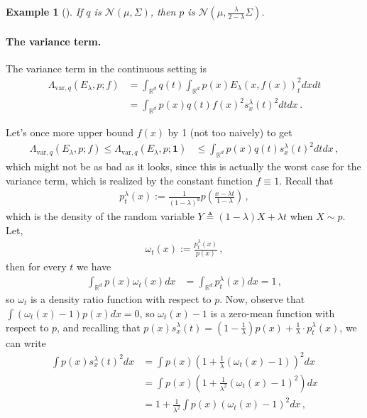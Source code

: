 \documentclass{article}
\theoremstyle{plain}
\theoremstyle{definition}
\theoremstyle{plain}
\newtheorem{exampleinner}[theorem]{Example}
\newenvironment{example}[1][]{%
    \begin{mdframed}[style=examplestyle]%
    \begin{exampleinner}[#1]%
}{%
    \end{exampleinner}%
    \end{mdframed}%
}
\newcommand{\Rd}{\mathbb{R}^d}
\newcommand{\cN}{\mathcal N}
\begin{document}
\begin{example}
    If $q$ is $\cN(\mu, \Sigma)$, then $p$ is $\cN(\mu, \frac{\lambda}{2-\lambda}\Sigma)$.
\end{example}

\paragraph{The variance term.}
The variance term  in the continuous setting is
\begin{align}
    \Lambda_{\text{var}, q}(E_\lambda, p; f)
     & =
    \int_{\Rd} q(t) \int_{\Rd} p(x) E_\lambda(x, f(x))_t^2 dx dt \\
     & = \int_{\Rd} p(x) q(t) f(x)^2 s^\lambda_x(t)^2 dt dx\,.
\end{align}

Let's once more upper bound $f(x)$ by 1 (not too naively) to get
\begin{align}
    \Lambda_{\text{var}, q}(E_\lambda, p; f)
    \leq
    \Lambda_{\text{var}, q}(E_\lambda, p; \mathbf{1})
     & \le \int_{\Rd} p(x) q(t) s^\lambda_x(t)^2 dt dx\,,
\end{align}
which might not be as bad as it looks, since this is actually the worst case for the variance
term, which is realized by the constant function $f\equiv 1$.
Recall that
\begin{align}
    p_t^\lambda(x) := \frac{1}{(1-\lambda)^{d}}p\left(
    \frac{
        x - \lambda t
    }{
        1 - \lambda
    }
    \right)\,,
\end{align}
which is the density of the random variable $Y\triangleq(1-\lambda)X + \lambda t$ when $X\sim p$.
Let,
\begin{align}
    \omega_t(x) := \frac{p_t^\lambda(x)}{p(x)}\,,
\end{align}
then for every $t$ we have
\begin{align}
    \int_{\Rd} p(x) \omega_t(x) dx
     & = \int_{\Rd} p_t^\lambda(x) dx
    = 1\,,
\end{align}
so $\omega_t$ is a density ratio function with respect to $p$.
Now, observe that $\int (\omega_t(x) - 1) p(x) dx = 0$, so $\omega_t(x)-1$ is a zero-mean function with respect to $p$,
and recalling that $p(x)s^\lambda_x(t) = (1 - \frac{1}{\lambda})p(x) + \frac{1}{\lambda} \cdot p_t^\lambda\left(x\right)$,
we can write
\begin{align}
    \int p(x) s_x^\lambda(t)^2 dx
     & = \int p(x) \left(1 + \frac{1}{\lambda}(\omega_t(x) - 1)\right)^2 dx   \\
     & = \int p(x) \left(1 + \frac{1}{\lambda^2}(\omega_t(x) - 1)^2\right) dx \\
     & = 1 + \frac{1}{\lambda^2}\int p(x) (\omega_t(x) - 1)^2 dx\,,
\end{align}
\end{document}

